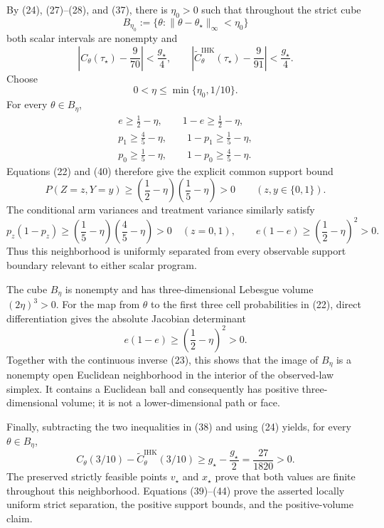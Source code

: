 By (24), (27)--(28), and (37), there is \(\eta_0>0\) such that throughout the strict cube
\[
B_{\eta_0}:=\{\theta:\|\theta-\theta_\star\|_\infty<\eta_0\}
\]
both scalar intervals are nonempty and
\[
\left|C_\theta(\tau_\star)-\frac9{70}\right|<\frac{g_\star}{4},
\qquad
\left|\widetilde C^{\mathrm{IHK}}_\theta(\tau_\star)-\frac9{91}\right|<\frac{g_\star}{4}.
\tag{38}
\]
Choose
\[
0<\eta\leq\min\{\eta_0,1/10\}.
\tag{39}
\]
For every \(\theta\in B_\eta\),
\[
\begin{gathered}
e\geq\frac12-\eta,\qquad 1-e\geq\frac12-\eta,\\
p_1\geq\frac45-\eta,\qquad 1-p_1\geq\frac15-\eta,\\
p_0\geq\frac15-\eta,\qquad 1-p_0\geq\frac45-\eta.
\end{gathered}
\tag{40}
\]
Equations (22) and (40) therefore give the explicit common support bound
\[
P(Z=z,Y=y)
\geq\left(\frac12-\eta\right)
       \left(\frac15-\eta\right)>0
\qquad(z,y\in\{0,1\}).
\tag{41}
\]
The conditional arm variances and treatment variance similarly satisfy
\[
p_z(1-p_z)
\geq\left(\frac15-\eta\right)
       \left(\frac45-\eta\right)>0
\quad(z=0,1),
\qquad
e(1-e)\geq\left(\frac12-\eta\right)^2>0.
\tag{42}
\]
Thus this neighborhood is uniformly separated from every observable support boundary relevant to either scalar program.

The cube \(B_\eta\) is nonempty and has three-dimensional Lebesgue volume \((2\eta)^3>0\).  For the map from \(\theta\) to the first three cell probabilities in (22), direct differentiation gives the absolute Jacobian determinant
\[
e(1-e)\geq\left(\frac12-\eta\right)^2>0.
\tag{43}
\]
Together with the continuous inverse (23), this shows that the image of \(B_\eta\) is a nonempty open Euclidean neighborhood in the interior of the observed-law simplex.  It contains a Euclidean ball and consequently has positive three-dimensional volume; it is not a lower-dimensional path or face.

Finally, subtracting the two inequalities in (38) and using (24) yields, for every \(\theta\in B_\eta\),
\[
C_\theta(3/10)-\widetilde C^{\mathrm{IHK}}_\theta(3/10)
\geq g_\star-\frac{g_\star}{2}
=\frac{27}{1820}>0.
\tag{44}
\]
The preserved strictly feasible points \(v_\star\) and \(x_\star\) prove that both values are finite throughout this neighborhood.  Equations (39)--(44) prove the asserted locally uniform strict separation, the positive support bounds, and the positive-volume claim.
